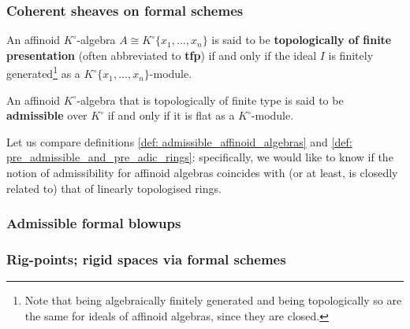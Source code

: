         \subsubsection{Coherent sheaves on formal schemes}
            \begin{definition} \label{def: affinoid_algebras_topologically_of_finite_presentation}
                An affinoid $K^{\circ}$-algebra $A \cong K^{\circ}\{x_1, ..., x_n\}$ is said to be \textbf{topologically of finite presentation} (often abbreviated to \textbf{tfp}) if and only if the ideal $I$ is finitely generated\footnote{Note that being algebraically finitely generated and being topologically so are the same for ideals of affinoid algebras, since they are closed.} as a $K^{\circ}\{x_1, ..., x_n\}$-module. 
            \end{definition}
            \begin{definition} \label{def: admissible_affinoid_algebras}
                An affinoid $K^{\circ}$-algebra that is topologically of finite type is said to be \textbf{admissible} over $K^{\circ}$ if and only if it is flat as a $K^{\circ}$-module. 
            \end{definition}
            \begin{remark}
                Let us compare definitions \ref{def: admissible_affinoid_algebras} and \ref{def: pre_admissible_and_pre_adic_rings}: specifically, we would like to know if the notion of admissibility for affinoid algebras coincides with (or at least, is closedly related to) that of linearly topologised rings.
            \end{remark}
        
        \subsubsection{Admissible formal blowups}
        
        \subsubsection{Rig-points; rigid spaces via formal schemes}